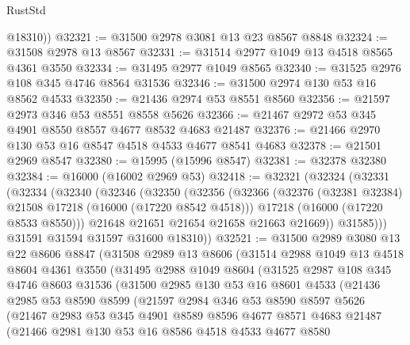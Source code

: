 \begin{lexlean}{RustStd}
\begin{coremodule}
        @18310))
@32321 := @31500 @2978 @3081 @13 @23 @8567 @8848
@32324 := @31508 @2978 @13 @8567
@32331 := @31514 @2977 @1049 @13 @4518 @8565 @4361 @3550
@32334 := @31495 @2977 @1049 @8565
@32340 := @31525 @2976 @108 @345 @4746 @8564 @31536
@32346 := @31500 @2974 @130 @53 @16 @8562 @4533
@32350 := @21436 @2974 @53 @8551 @8560
@32356 := @21597 @2973 @346 @53 @8551 @8558 @5626
@32366 := @21467 @2972 @53 @345 @4901 @8550 @8557 @4677 @8532 @4683 @21487
@32376 := @21466 @2970 @130 @53 @16 @8547 @4518 @4533 @4677 @8541 @4683
@32378 := @21501 @2969 @8547
@32380 := @15995 (@15996 @8547)
@32381 := @32378 @32380
@32384 := @16000 (@16002 @2969 @53)
@32418 := @32321
    (@32324
      (@32331
        (@32334
          (@32340
            (@32346
              (@32350
                (@32356
                  (@32366
                    (@32376 (@32381 @32384) @21508 @17218 (@16000 (@17220 @8542 @4518)))
                    @17218
                    (@16000 (@17220 @8533 @8550)))
                  @21648
                  @21651
                  @21654
                  @21658
                  @21663
                  @21669))
              @31585)))
        @31591
        @31594
        @31597
        @31600
        @18310))
@32521 := @31500
    @2989
    @3080
    @13
    @22
    @8606
    @8847
    (@31508
      @2989
      @13
      @8606
      (@31514
        @2988
        @1049
        @13
        @4518
        @8604
        @4361
        @3550
        (@31495
          @2988
          @1049
          @8604
          (@31525
            @2987
            @108
            @345
            @4746
            @8603
            @31536
            (@31500
              @2985
              @130
              @53
              @16
              @8601
              @4533
              (@21436
                @2985
                @53
                @8590
                @8599
                (@21597
                  @2984
                  @346
                  @53
                  @8590
                  @8597
                  @5626
                  (@21467
                    @2983
                    @53
                    @345
                    @4901
                    @8589
                    @8596
                    @4677
                    @8571
                    @4683
                    @21487
                    (@21466
                      @2981
                      @130
                      @53
                      @16
                      @8586
                      @4518
                      @4533
                      @4677
                      @8580

\end{coremodule}
\end{lexlean}
